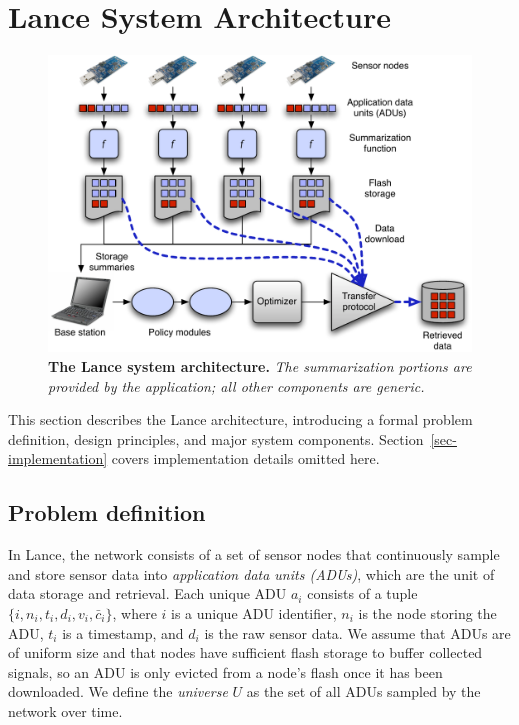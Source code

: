\section{Lance System Architecture}
\label{sec-architecture}

\begin{figure}[t]
\begin{center}
\includegraphics[width=1.0\hsize]{./lance/figs/new-arch.pdf}
\end{center}
\caption{\small {\bf The Lance system architecture.} {\em The
summarization portions are provided by the
application; all other components are generic.}}
\label{fig-architecture}
\end{figure}

This section describes the Lance architecture, introducing a
formal problem definition, design principles, and major system components.
Section~\ref{sec-implementation} covers implementation details omitted here.

\subsection{Problem definition}
\label{sec-problem-definition}

In Lance, the network consists of a set of sensor nodes that continuously
sample and store sensor data into {\em application data units (ADUs)}, which
are the unit of data storage and retrieval.  Each unique ADU $a_i$ consists
of a tuple $\{ i, n_i, t_i, d_i, v_i, \bar{c}_i \}$, 
where $i$ is a unique ADU identifier,
$n_i$ is the node storing the ADU, $t_i$ is a timestamp, and $d_i$ is the raw
sensor data.  We assume that ADUs are of uniform size and that nodes 
have sufficient flash storage to buffer collected signals, so an 
ADU is only evicted from a node's flash once it has been downloaded.
We define the {\em universe} $U$ as the set of all ADUs sampled by the 
network over time. 

